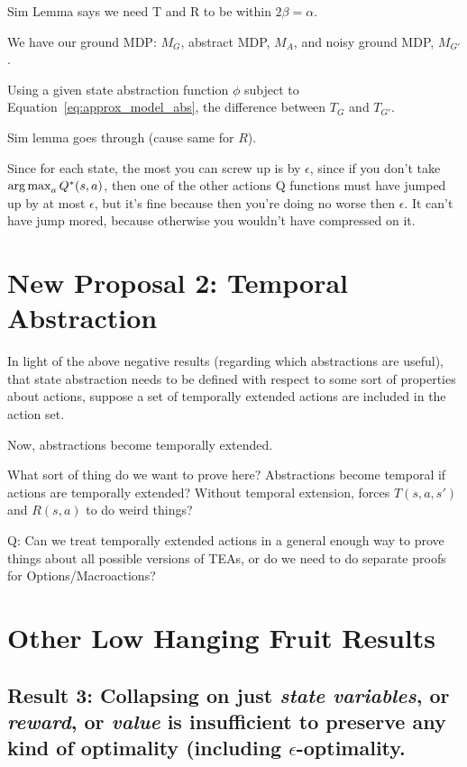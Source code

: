 \documentclass[11pt]{amsart}
\begin{document}
Sim Lemma says we need T and R to be within $2\beta = \alpha$.

We have our ground MDP: $M_G$, abstract MDP, $M_A$, and noisy ground MDP, $M_{G'}$.

Using a given state abstraction function $\phi$ subject to Equation~\ref{eq:approx_model_abs}, the difference between $T_G$ and $T_{G'}$.

Sim lemma goes through (cause same for $R$).


Since for each state, the most you can screw up is by $\epsilon$, since if you don't take $\operatorname*{arg\,max}_a Q^*(s,a)$, then one of the other actions Q functions must have jumped up by at most $\epsilon$, but it's fine because then you're doing no worse then $\epsilon$. It can't have jump mored, because otherwise you wouldn't have compressed on it.


\newpage
\section{New Proposal 2: Temporal Abstraction}

In light of the above negative results (regarding which abstractions are useful), that state abstraction needs to be defined with respect to some sort of properties about actions, suppose a set of temporally extended actions are included in the action set.

Now, abstractions become temporally extended.

What sort of thing do we want to prove here? Abstractions become temporal if actions are temporally extended? Without temporal extension, forces $T(s,a,s')$ and $R(s,a)$ to do weird things?

Q: Can we treat temporally extended actions in a general enough way to prove things about all possible versions of TEAs, or do we need to do separate proofs for Options/Macroactions?


\newpage
\section{Other Low Hanging Fruit Results}


\subsection{Result 3: Collapsing on just {\it state variables}, or {\it reward}, or {\it value} is insufficient to preserve any kind of optimality (including $\epsilon$-optimality.}
\end{document}
